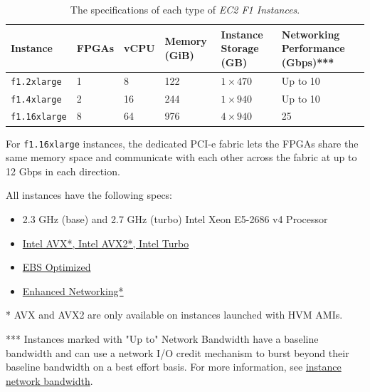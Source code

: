 \documentclass[a4paper]{article}
\begin{document}
    \begin{table}[!htp]
        \centering
        \begin{tabular}{@{} l p{4em} p{4em} p{4em} p{4em} p{6em} @{}}
            \toprule
            \textbf{Instance} & \textbf{FPGAs} & \textbf{vCPU} & \textbf{Memory (GiB)} & \textbf{Instance Storage (GB)} & \textbf{Networking Performance (Gbps)***} \\
            \midrule
            \texttt{f1.2xlarge}     & 1 & 8 & 122 & $1 \times 470$ & Up to 10 \\
            \texttt{f1.4xlarge}     & 2 & 16 & 244 & $1 \times 940$ & Up to 10 \\
            \texttt{f1.16xlarge}    & 8 & 64 & 976 & $4 \times 940$ & 25 \\
            \bottomrule
        \end{tabular}
        \caption{The specifications of each type of \emph{EC2 F1 Instances}.}
        \label{tab: the specifications of each type of EC2 F1 Instances}
    \end{table}
    For \texttt{f1.16xlarge} instances, the dedicated PCI-e fabric lets the FPGAs share the same memory space and communicate with each other across the fabric at up to 12 Gbps in each direction.\newline

    \noindent
    All instances have the following specs:
    \begin{itemize}
        \item 2.3 GHz (base) and 2.7 GHz (turbo) Intel Xeon E5-2686 v4 Processor

        \item \href{https://aws.amazon.com/ec2/instance-types/#Intel}{Intel AVX*, Intel AVX2*, Intel Turbo}

        \item \href{https://aws.amazon.com/ec2/instance-types/#EBS}{EBS Optimized}

        \item \href{https://aws.amazon.com/ec2/details/#enhanced-networking}{Enhanced Networking*}
    \end{itemize}
    * AVX and AVX2 are only available on instances launched with HVM AMIs.\newline

    \noindent
    *** Instances marked with "Up to" Network Bandwidth have a baseline bandwidth and can use a network I/O credit mechanism to burst beyond their baseline bandwidth on a best effort basis. For more information, see \href{https://docs.aws.amazon.com/AWSEC2/latest/UserGuide/ec2-instance-network-bandwidth.html}{instance network bandwidth}.\newpage
\end{document}
